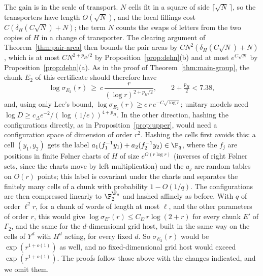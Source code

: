 \begin{remark}
The gain is in the scale of transport. $N$ cells fit in a square of side $\lceil\sqrt N\,\rceil$, so the transporters have length $O(\sqrt N)$, and
the local fillings cost $C(\delta_H(C\sqrt N)+N)$; the term $N$ counts the swaps of letters from the two copies of $H$ in a change of transporter.
The clearing argument of Theorem~\ref{thm:pair-area} then bounds the pair areas by $CN^2(\delta_H(C\sqrt N)+N)$, which is at most $CN^{2+p_H/2}$ by
Proposition~\ref{prop:dehn}(b) and at most $e^{C\sqrt N}$ by Proposition~\ref{prop:dehn}(a). As in the proof of Theorem~\ref{thm:main-group}, the chunk
$E_2$ of this certificate should therefore have
\[
\log\sigma_{E_2}(r)\ \ge\ c\,\frac{r}{(\log r)^{2+p_H/2}},\qquad 2+\tfrac{p_H}2<7.38,
\]
and, using only Lee's bound, $\log\sigma_{E_2}(r)\ge c\,r\,e^{-C\sqrt{\log r}}$; unitary models need $\log D\ge c_\Delta e^{-2}/(\log(1/e))^{4+p_H}$.
In the other direction, hashing the configurations directly, as in Proposition~\ref{prop:upper}, would need a configuration space of dimension
of order $r^2$. Hashing the cells first avoids this: a cell $(y_1,y_2)$ gets the label $a_1(f_1^{-1}y_1)+a_2(f_2^{-1}y_2)\in\F_q$, where the $f_j$ are
positions in finite F{\o}lner charts of $H$ of size $e^{O(r\log r)}$ (inverses of right F{\o}lner sets, since the charts move by left
multiplication) and the $a_j$ are random tables on $O(r)$ points; this label is covariant under the
charts and separates the finitely many cells of a chunk with probability $1-O(1/q)$. The configurations are then compressed linearly to
$\F_2^{\F_q}$ and hashed affinely as before. With $q$ of order $\ell^2r$, for a chunk of words of length at most $\ell$, and the other parameters of order $r$, this would give $\log\sigma_{E'}(r)\le C_{E'}r\log(2+r)$ for
every chunk $E'$ of $\Gamma_2$, and the same for the $d$-dimensional grid host, built in the same way on the cells of $Y^d$ with $H^d$ acting,
for every fixed $d$. So $\sigma_{E_2}(r)$ would be $\exp(r^{1+o(1)})$ as well, and no fixed-dimensional
grid host would exceed $\exp(r^{1+o(1)})$. The proofs follow those above with the changes indicated, and we omit them.
\end{remark}
